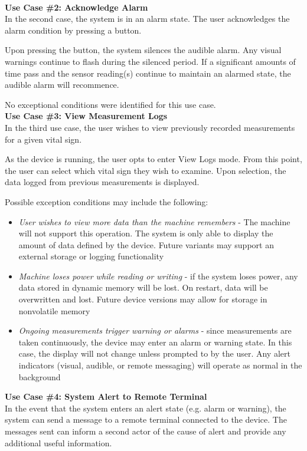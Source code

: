\documentclass[12pt]{article} %
\begin{document}
~\\
\textbf{Use Case \#2: Acknowledge Alarm} \\
In the second case, the system is in an alarm state. The user acknowledges
the alarm condition by pressing a button.

Upon pressing the button, the system silences the audible alarm. Any visual
warnings continue to flash during the silenced period. If a significant amounts
of time pass and the sensor reading(s) continue to maintain an alarmed state,
the audible alarm will recommence.

No exceptional conditions were identified for this use case.\\

\textbf{Use Case \#3: View Measurement Logs} \\
In the third use case, the user wishes to view previously recorded measurements for a given vital sign.

As the device is running, the user opts to enter View Logs mode. From this
point, the user can select which vital sign they wish to examine. Upon
selection, the data logged from previous measurements is displayed.

Possible exception conditions may include the following:
\begin{itemize}
  \item \emph{User wishes to view more data than the machine remembers} - The
    machine will not support this operation. The system is only able to display
    the amount of data defined by the device. Future variants may support an
    external storage or logging functionality
  \item \emph{Machine loses power while reading or writing} - if the system
    loses power, any data stored in dynamic memory will be lost. On restart,
    data will be overwritten and lost. Future device versions may allow for
    storage in nonvolatile memory
  \item \emph{Ongoing measurements trigger warning or alarms} - since
    measurements are taken continuously, the device may enter an alarm or
    warning state. In this case, the display will not change unless prompted to
    by the user. Any alert indicators (visual, audible, or remote messaging)
    will operate as normal in the background
\end{itemize}

\textbf{Use Case \#4: System Alert to Remote Terminal}\\
In the event that the system enters an alert state (e.g. alarm or warning), the
system can send a message to a remote terminal connected to the device. The
messages sent can inform a second actor of the cause of alert and provide any
additional useful information.
\end{document}
